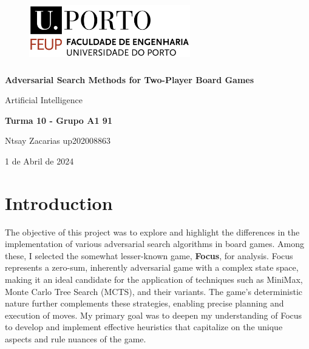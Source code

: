 \documentclass[a4paper, 11pt]{article}
\begin{document}
\begin{titlepage}

\begin{center}


\begin{figure}[h]
    \centering
    \includegraphics[width=7cm, height=2.75cm]{feup}
\end{figure}
\vspace{100pt}

\LARGE{\textbf{Adversarial Search Methods for Two-Player Board Games}} \par
\large{Artificial Intelligence}

\vspace{70pt}

\Large{\textbf{Turma 10 - Grupo A1 91}} \par

\vspace{20pt}

\normalsize{
Ntsay Zacarias up202008863 \par
}


\vspace{90pt}

\large{1 de Abril de 2024}

\end{center}

\end{titlepage}

\newpage

\tableofcontents

\newpage

\section{Introduction}
The objective of this project was to explore and highlight the differences in the implementation of various adversarial search algorithms in board games. Among these, I selected the somewhat lesser-known game, \textbf{Focus}, for analysis. Focus represents a zero-sum, inherently adversarial game with a complex state space, making it an ideal candidate for the application of techniques such as MiniMax, Monte Carlo Tree Search (MCTS), and their variants. The game's deterministic nature further complements these strategies, enabling precise planning and execution of moves. My primary goal was to deepen my understanding of Focus to develop and implement effective heuristics that capitalize on the unique aspects and rule nuances of the game.
\end{document}
